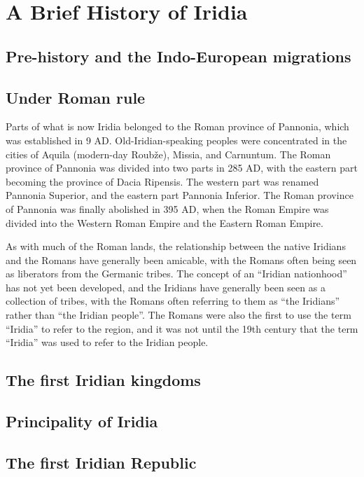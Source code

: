 \chapter{A Brief History of Iridia}

\section{Pre-history and the Indo-European migrations}

\section{Under Roman rule}

Parts of what is now Iridia belonged to the Roman province of Pannonia, which was established in 9 AD. Old-Iridian-speaking peoples were concentrated in the cities of Aquila (modern-day Roubže), Missia, and Carnuntum. The Roman province of Pannonia was divided into two parts in 285 AD, with the eastern part becoming the province of Dacia Ripensis. The western part was renamed Pannonia Superior, and the eastern part Pannonia Inferior. The Roman province of Pannonia was finally abolished in 395 AD, when the Roman Empire was divided into the Western Roman Empire and the Eastern Roman Empire.

As with much of the Roman lands, the relationship between the native Iridians and the Romans have generally been amicable, with the Romans often being seen as liberators from the Germanic tribes. The concept of an ``Iridian nationhood'' has not yet been developed, and the Iridians have generally been seen as a collection of tribes, with the Romans often referring to them as ``the Iridians'' rather than ``the Iridian people''. The Romans were also the first to use the term ``Iridia'' to refer to the region, and it was not until the 19th century that the term ``Iridia'' was used to refer to the Iridian people. 


\section{The first Iridian kingdoms}


\section{Principality of Iridia}



\section{The first Iridian Republic}

